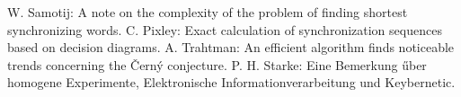 \documentclass[12pt,a4paper]{article}
\begin{document}
\begin{thebibliography}{99}
 W. Samotij: A note on the complexity of the problem of finding shortest synchronizing words.
 C. Pixley: Exact calculation of synchronization sequences based on decision diagrams.
 A. Trahtman: An efficient algorithm finds noticeable trends concerning the \v Cern\'y conjecture.
 P. H. Starke: Eine Bemerkung \H uber homogene Experimente, Elektronische Informationverarbeitung und Keybernetic.
\end{thebibliography}
\end{document}
